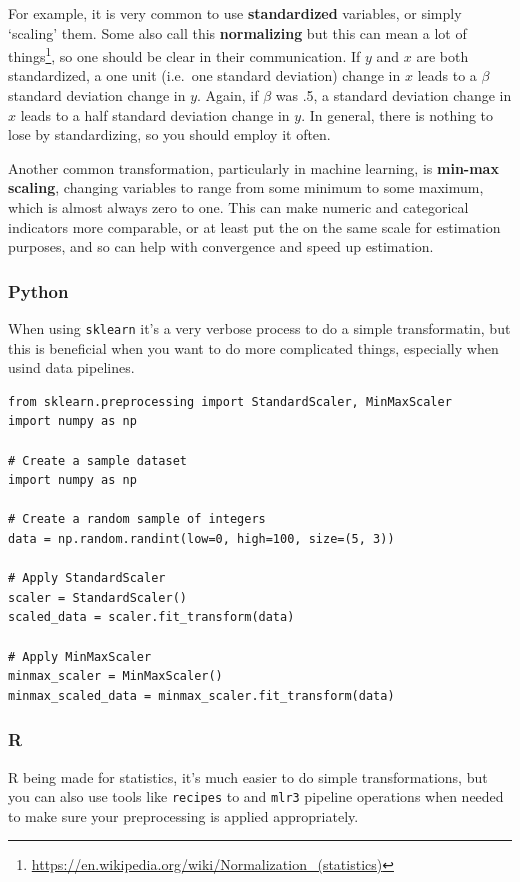 \documentclass[
  letterpaper,
]{krantz}
\DeclareRobustCommand{\href}[2]{#2\footnote{\url{#1}}}
\begin{document}
For example, it is very common to use \textbf{standardized} variables,
or simply `scaling' them. Some also call this \textbf{normalizing} but
\href{https://en.wikipedia.org/wiki/Normalization_(statistics)}{this can
mean a lot of things}, so one should be clear in their communication. If
\(y\) and \(x\) are both standardized, a one unit (i.e.~one standard
deviation) change in \(x\) leads to a \(\beta\) standard deviation
change in \(y\). Again, if \(\beta\) was .5, a standard deviation change
in \(x\) leads to a half standard deviation change in \(y\). In general,
there is nothing to lose by standardizing, so you should employ it
often.

Another common transformation, particularly in machine learning, is
\textbf{min-max scaling}, changing variables to range from some minimum
to some maximum, which is almost always zero to one. This can make
numeric and categorical indicators more comparable, or at least put the
on the same scale for estimation purposes, and so can help with
convergence and speed up estimation.

\subsubsection{Python}

When using \texttt{sklearn} it's a very verbose process to do a simple
transformatin, but this is beneficial when you want to do more
complicated things, especially when usind data pipelines.

\begin{verbatim}
from sklearn.preprocessing import StandardScaler, MinMaxScaler
import numpy as np

# Create a sample dataset
import numpy as np

# Create a random sample of integers
data = np.random.randint(low=0, high=100, size=(5, 3))

# Apply StandardScaler
scaler = StandardScaler()
scaled_data = scaler.fit_transform(data)

# Apply MinMaxScaler
minmax_scaler = MinMaxScaler()
minmax_scaled_data = minmax_scaler.fit_transform(data)
\end{verbatim}

\subsubsection{R}

R being made for statistics, it's much easier to do simple
transformations, but you can also use tools like \texttt{recipes} to and
\texttt{mlr3} pipeline operations when needed to make sure your
preprocessing is applied appropriately.
\end{document}
